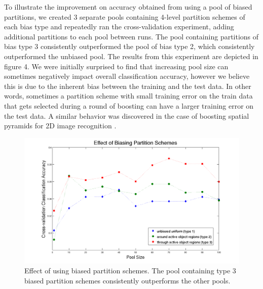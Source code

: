 \documentclass{bmvc2k}
\begin{document}
  To illustrate the improvement on accuracy obtained from using a pool of
  biased partitions, we created 3 separate pools containing 4-level
  partition schemes of each bias type and
  repeatedly ran the cross-validation experiment, adding additional
  partitions to each pool between runs. The pool containing partitions of
  bias type 3 consistently outperformed the pool of bias type 2, which
  consistently outperformed the unbiased pool. The
  results from this experiment are depicted in figure 4. We were initially
  surprised to find that increasing pool size can
  sometimes negatively impact overall classification accuracy, however we
  believe this is due to the inherent bias between the training and the test
  data. In other words, sometimes a partition scheme with small training error
  on the train data that gets selected during a round of boosting can have a
  larger training error on the test data. A similar behavior was discovered
  in the case of boosting spatial pyramids for 2D image recognition
  \cite{Jiang12}.
 
  \begin{figure}[t]
		\begin{center}
			  \includegraphics[width=1.0\linewidth]{figures/biaseffect.png}
		\end{center}
		   \caption{Effect of using biased partition schemes. The pool
       containing type 3 biased partition schemes consistently outperforms
     the other pools.}
				\label{fig:long}
				\label{fig:onecol}
	\end{figure}
  
\end{document}
